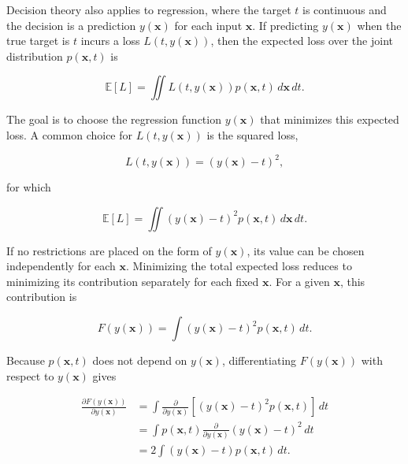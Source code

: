 \documentclass[10pt,twocolumn]{memoir}
\begin{document}
Decision theory also applies to regression, where the target $t$ is continuous and the decision is a prediction $y(\mathbf{x})$ for each input $\mathbf{x}$. If predicting $y(\mathbf{x})$ when the true target is $t$ incurs a loss $L(t,y(\mathbf{x}))$, then the expected loss over the joint distribution $p(\mathbf{x},t)$ is

\begin{equation}
    \mathbb{E}[L] = \iint L(t,y(\mathbf{x}))p(\mathbf{x},t)\,d\mathbf{x}\,dt.
\end{equation}

The goal is to choose the regression function $y(\mathbf{x})$ that minimizes this expected loss. A common choice for $L(t, y(\mathbf{x}))$ is the squared loss,

\begin{equation}
    L(t,y(\mathbf{x})) = \left(y(\mathbf{x})-t\right)^2,
\end{equation}

for which

\begin{equation}
    \mathbb{E}[L] = \iint \left(y(\mathbf{x})-t\right)^2 p(\mathbf{x},t)\,d\mathbf{x}\,dt.
\end{equation}

If no restrictions are placed on the form of $y(\mathbf{x})$, its value can be chosen independently for each $\mathbf{x}$. Minimizing the total expected loss reduces to minimizing its contribution separately for each fixed $\mathbf{x}$. For a given $\mathbf{x}$, this contribution is

\begin{equation}
    F(y(\mathbf{x})) = \int\left(y(\mathbf{x})-t\right)^2 p(\mathbf{x},t)\,dt.
\end{equation}

Because $p(\mathbf{x},t)$ does not depend on $y(\mathbf{x})$, differentiating $F(y(\mathbf{x}))$ with respect to $y(\mathbf{x})$ gives

\begin{equation}
\begin{aligned}
    \frac{\partial F(y(\mathbf{x}))}{\partial y(\mathbf{x})}
    &= \int \frac{\partial}{\partial y(\mathbf{x})}\left[\left(y(\mathbf{x})-t\right)^2 p(\mathbf{x},t)\right]\,dt \\
    &= \int p(\mathbf{x},t)\frac{\partial}{\partial y(\mathbf{x})}\left(y(\mathbf{x})-t\right)^2\,dt \\
    &= 2\int \left(y(\mathbf{x})-t\right)p(\mathbf{x},t)\,dt.
\end{aligned}
\end{equation}
\end{document}
